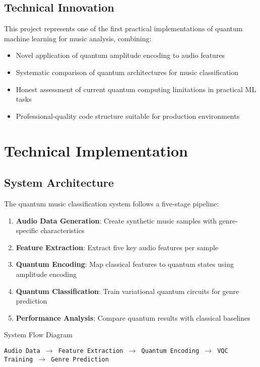 \documentclass[11pt,a4paper]{article}
\begin{document}
\subsection{Technical Innovation}
This project represents one of the first practical implementations of quantum machine learning for music analysis, combining:
\begin{itemize}
    \item Novel application of quantum amplitude encoding to audio features
    \item Systematic comparison of quantum architectures for music classification
    \item Honest assessment of current quantum computing limitations in practical ML tasks
    \item Professional-quality code structure suitable for production environments
\end{itemize}

\section{Technical Implementation}

\subsection{System Architecture}

The quantum music classification system follows a five-stage pipeline:

\begin{enumerate}
    \item \textbf{Audio Data Generation}: Create synthetic music samples with genre-specific characteristics
    \item \textbf{Feature Extraction}: Extract five key audio features per sample
    \item \textbf{Quantum Encoding}: Map classical features to quantum states using amplitude encoding
    \item \textbf{Quantum Classification}: Train variational quantum circuits for genre prediction
    \item \textbf{Performance Analysis}: Compare quantum results with classical baselines
\end{enumerate}

\begin{keybox}{System Flow Diagram}
\begin{center}
\texttt{Audio Data $\rightarrow$ Feature Extraction $\rightarrow$ Quantum Encoding $\rightarrow$ VQC Training $\rightarrow$ Genre Prediction}
\end{center}
\end{keybox}
\end{document}
